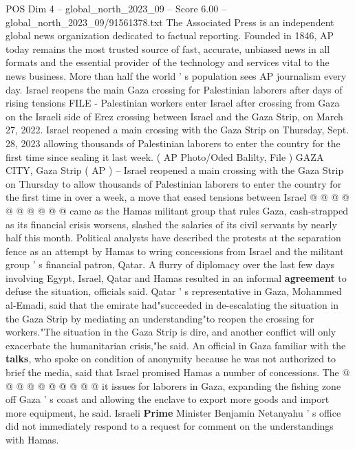 \begin{textsample}{POS Dim 4 – global\_north\_2023\_09 – Score 6.00 – global\_north\_2023\_09/91561378.txt}  \label{ex:f4_pos_415}
The Associated Press is an independent global news organization dedicated to factual reporting.
Founded in 1846, AP today remains the most trusted source of fast, accurate, unbiased news in all formats and the essential provider of the technology and services vital to the news business.
More than half the world ' s population sees AP journalism every day.
Israel reopens the main Gaza crossing for Palestinian laborers after days of rising tensions FILE - Palestinian workers enter Israel after crossing from Gaza on the Israeli side of Erez crossing between Israel and the Gaza Strip, on March 27, 2022.
Israel reopened a main crossing with the Gaza Strip on Thursday, Sept. 28, 2023 allowing thousands of Palestinian laborers to enter the country for the first time since sealing it last week. ( AP Photo/Oded Balilty, File ) GAZA CITY, Gaza Strip ( AP ) -- Israel reopened a main crossing with the Gaza Strip on Thursday to allow thousands of Palestinian laborers to enter the country for the first time in over a week, a move that eased tensions between Israel @ @ @ @ @ @ @ @ @ @ came as the Hamas militant group that rules Gaza, cash-strapped as its financial crisis worsens, slashed the salaries of its civil servants by nearly half this month.
Political analysts have described the protests at the separation fence as an attempt by Hamas to wring concessions from Israel and the militant group ' s financial patron, Qatar.
A flurry of diplomacy over the last few days involving Egypt, Israel, Qatar and Hamas resulted in an informal \textbf{agreement} to defuse the situation, officials said.
Qatar ' s representative in Gaza, Mohammed al-Emadi, said that the emirate had"succeeded in de-escalating the situation in the Gaza Strip by mediating an understanding"to reopen the crossing for workers."The situation in the Gaza Strip is dire, and another conflict will only exacerbate the humanitarian crisis,"he said.
An official in Gaza familiar with the \textbf{talks}, who spoke on condition of anonymity because he was not authorized to brief the media, said that Israel promised Hamas a number of concessions.
The @ @ @ @ @ @ @ @ @ @ it issues for laborers in Gaza, expanding the fishing zone off Gaza ' s coast and allowing the enclave to export more goods and import more equipment, he said.
Israeli \textbf{Prime} Minister Benjamin Netanyahu ' s office did not immediately respond to a request for comment on the understandings with Hamas.

\end{textsample}
